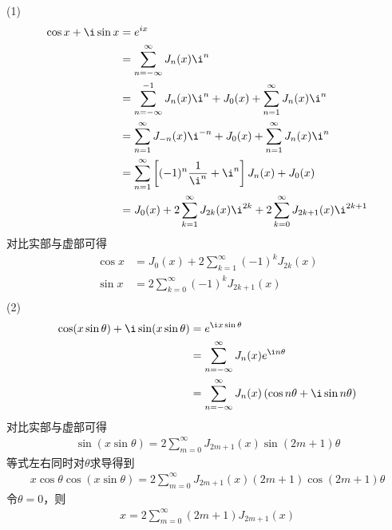 \documentclass{phyasgn}
\begin{document}
\begin{pf}[5]
    (1)
    \begin{align*}
        \cos x+\i\sin x&=e^{ix}\\
        &=\sum_{n=-\infty}^{\infty}J_n(x)\i^n\\
        &=\sum_{n=-\infty}^{-1}J_n(x)\i^n+J_0(x)+\sum_{n=1}^{\infty}J_n(x)\i^n\\
        &=\sum_{n=1}^{\infty}J_{-n}(x)\i^{-n}+J_0(x)+\sum_{n=1}^{\infty}J_n(x)\i^n\\
        &=\sum_{n=1}^{\infty}\left[(-1)^n\frac{1}{\i^n}+\i^n\right]J_n(x)+J_0(x)\\
        &=J_0(x)+2\sum_{k=1}^{\infty}J_{2k}(x)\i^{2k}+2\sum_{k=0}^{\infty}J_{2k+1}(x)\i^{2k+1}
    \end{align*}
    对比实部与虚部可得
    \begin{align*}
        \cos x&=J_0(x)+2\sum_{k=1}^{\infty}(-1)^kJ_{2k}(x)\\
        \sin x&=2\sum_{k=0}^{\infty}(-1)^kJ_{2k+1}(x)\\
    \end{align*}
    (2)\begin{align*}
        \cos(x\sin\theta)+\i\sin(x\sin\theta)&=e^{\i x\sin\theta}\\
        &=\sum_{n=-\infty}^{\infty}J_n(x)e^{\i n\theta}\\
        &=\sum_{n=-\infty}^{\infty}J_n(x)\left(\cos n\theta+\i\sin n\theta\right)
    \end{align*}
    对比实部与虚部可得
    \begin{align*}
        \sin(x\sin\theta)=2\sum_{m=0}^{\infty}J_{2m+1}(x)\sin(2m+1)\theta
    \end{align*}
    等式左右同时对$\theta$求导得到
    \begin{align*}
        x\cos\theta\cos(x\sin\theta)=2\sum_{m=0}^{\infty}J_{2m+1}(x)(2m+1)\cos(2m+1)\theta
    \end{align*}
    令$\theta=0$，则
    \begin{align*}
        x=2\sum_{m=0}^{\infty}(2m+1)J_{2m+1}(x)
    \end{align*}
\end{pf}\par
\end{document}
